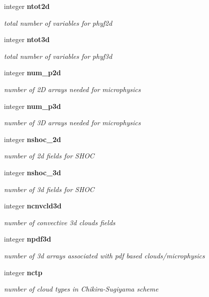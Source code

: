 \begin{DoxyCompactItemize}
integer \textbf{ ntot2d}
\begin{DoxyCompactList}\small\item\em total number of variables for phyf2d \end{DoxyCompactList}\item 
integer \textbf{ ntot3d}
\begin{DoxyCompactList}\small\item\em total number of variables for phyf3d \end{DoxyCompactList}\item 
integer \textbf{ num\+\_\+p2d}
\begin{DoxyCompactList}\small\item\em number of 2D arrays needed for microphysics \end{DoxyCompactList}\item 
integer \textbf{ num\+\_\+p3d}
\begin{DoxyCompactList}\small\item\em number of 3D arrays needed for microphysics \end{DoxyCompactList}\item 
integer \textbf{ nshoc\+\_\+2d}
\begin{DoxyCompactList}\small\item\em number of 2d fields for S\+H\+OC \end{DoxyCompactList}\item 
integer \textbf{ nshoc\+\_\+3d}
\begin{DoxyCompactList}\small\item\em number of 3d fields for S\+H\+OC \end{DoxyCompactList}\item 
integer \textbf{ ncnvcld3d}
\begin{DoxyCompactList}\small\item\em number of convective 3d clouds fields \end{DoxyCompactList}\item 
integer \textbf{ npdf3d}
\begin{DoxyCompactList}\small\item\em number of 3d arrays associated with pdf based clouds/microphysics \end{DoxyCompactList}\item 
integer \textbf{ nctp}
\begin{DoxyCompactList}\small\item\em number of cloud types in Chikira-\/\+Sugiyama scheme \end{DoxyCompactList}\item 

\end{DoxyCompactItemize}
